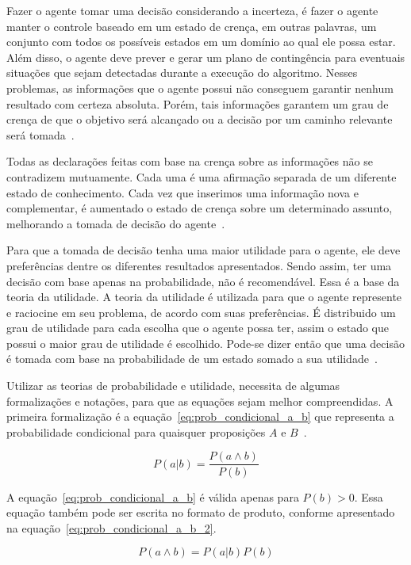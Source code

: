 Fazer o agente tomar uma decisão considerando a incerteza, é fazer o agente manter o controle baseado em um estado de crença, em outras palavras, um conjunto com todos os possíveis estados em um domínio ao qual ele possa estar. Além disso, o agente deve prever e gerar um plano de contingência para eventuais situações que sejam detectadas durante a execução do algoritmo. Nesses problemas, as informações que o agente possui não conseguem garantir nenhum resultado com certeza absoluta. Porém, tais informações garantem um grau de crença de que o objetivo será alcançado ou a decisão por um caminho relevante será tomada~\cite{russell:2002}.

Todas as declarações feitas com base na crença sobre as informações não se contradizem mutuamente. Cada uma é uma afirmação separada de um diferente estado de conhecimento. Cada vez que inserimos uma informação nova e complementar, é aumentado o estado de crença sobre um determinado assunto, melhorando a tomada de decisão do agente~\cite{russell:2002}.

Para que a tomada de decisão tenha uma maior utilidade para o agente, ele deve preferências dentre os diferentes resultados apresentados. Sendo assim, ter uma decisão com base apenas na probabilidade, não é recomendável. Essa é a base da teoria da utilidade. A teoria da utilidade é utilizada para que o agente represente e raciocine em seu problema, de acordo com suas preferências. É distribuido um grau de utilidade para cada escolha que o agente possa ter, assim o estado que possui o maior grau de utilidade é escolhido. Pode-se dizer então que uma decisão é tomada com base na probabilidade de um estado somado a sua utilidade~\cite{russell:2002}.

Utilizar as teorias de probabilidade e utilidade, necessita de algumas formalizações e notações, para que as equações sejam melhor compreendidas. A primeira formalização é a equação~\ref{eq:prob_condicional_a_b} que representa a probabilidade condicional para quaisquer proposições $A$ e $B$~\cite{russell:2002}.

\begin{equation}
    \label{eq:prob_condicional_a_b}
    P(a|b) = \frac{P(a \land b)}{P(b)}
\end{equation}

A equação~\ref{eq:prob_condicional_a_b} é válida apenas para $P(b) > 0$. Essa equação também pode ser escrita no formato de produto, conforme apresentado na equação~\ref{eq:prob_condicional_a_b_2}.

\begin{equation}
    \label{eq:prob_condicional_a_b_2}
    P(a \land b) = P(a|b)P(b)
\end{equation}

